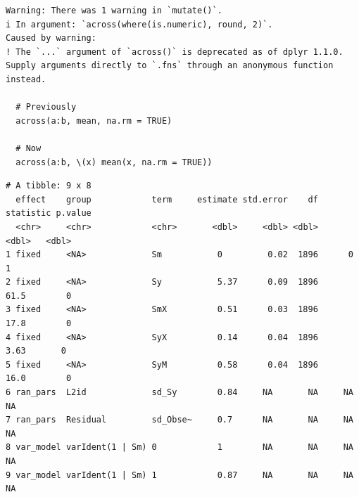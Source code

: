 \documentclass[
  letterpaper,
  DIV=11,
  numbers=noendperiod]{scrreprt}
\newenvironment{Shaded}{\begin{snugshade}}{\end{snugshade}}
\newcommand{\AttributeTok}[1]{\textcolor[rgb]{0.40,0.45,0.13}{#1}}
\newcommand{\CommentTok}[1]{\textcolor[rgb]{0.37,0.37,0.37}{#1}}
\newcommand{\ConstantTok}[1]{\textcolor[rgb]{0.56,0.35,0.01}{#1}}
\newcommand{\DecValTok}[1]{\textcolor[rgb]{0.68,0.00,0.00}{#1}}
\newcommand{\FunctionTok}[1]{\textcolor[rgb]{0.28,0.35,0.67}{#1}}
\newcommand{\NormalTok}[1]{\textcolor[rgb]{0.00,0.23,0.31}{#1}}
\newcommand{\OtherTok}[1]{\textcolor[rgb]{0.00,0.23,0.31}{#1}}
\newcommand{\SpecialCharTok}[1]{\textcolor[rgb]{0.37,0.37,0.37}{#1}}
\newcommand{\StringTok}[1]{\textcolor[rgb]{0.13,0.47,0.30}{#1}}
\begin{document}
\begin{Shaded}
\end{Shaded}

\begin{verbatim}
Warning: There was 1 warning in `mutate()`.
i In argument: `across(where(is.numeric), round, 2)`.
Caused by warning:
! The `...` argument of `across()` is deprecated as of dplyr 1.1.0.
Supply arguments directly to `.fns` through an anonymous function instead.

  # Previously
  across(a:b, mean, na.rm = TRUE)

  # Now
  across(a:b, \(x) mean(x, na.rm = TRUE))
\end{verbatim}

\begin{verbatim}
# A tibble: 9 x 8
  effect    group            term     estimate std.error    df statistic p.value
  <chr>     <chr>            <chr>       <dbl>     <dbl> <dbl>     <dbl>   <dbl>
1 fixed     <NA>             Sm           0         0.02  1896      0          1
2 fixed     <NA>             Sy           5.37      0.09  1896     61.5        0
3 fixed     <NA>             SmX          0.51      0.03  1896     17.8        0
4 fixed     <NA>             SyX          0.14      0.04  1896      3.63       0
5 fixed     <NA>             SyM          0.58      0.04  1896     16.0        0
6 ran_pars  L2id             sd_Sy        0.84     NA       NA     NA         NA
7 ran_pars  Residual         sd_Obse~     0.7      NA       NA     NA         NA
8 var_model varIdent(1 | Sm) 0            1        NA       NA     NA         NA
9 var_model varIdent(1 | Sm) 1            0.87     NA       NA     NA         NA
\end{verbatim}
\end{document}
